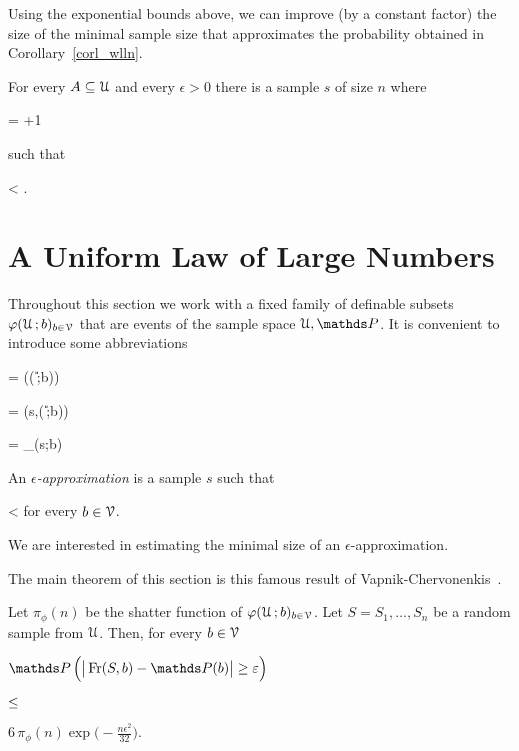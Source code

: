 \documentclass[scombinatorics.tex]{subfiles}
\begin{document}
Using the exponential bounds above, we can improve (by a constant factor) the size of the minimal sample size that approximates the probability obtained in Corollary~\ref{corl_wlln}.

\begin{corollary}
  For every $A\subseteq\EuScript U$ and every $\epsilon>0$ there is a sample $s$ of size $n$ where

  {=}
  {\left\lfloor{}+1\right\rfloor} 
      
  such that

  {<}
  {\epsilon.}\QED
\end{corollary}
\section{A Uniform Law of Large Numbers}\label{uniform}

Throughout this section we work with a fixed family of definable subsets $\varphi(\EuScript U\,;b)_{b\in\EuScript V}$ that are events of the sample space $\U,\Pr$.
It is convenient to introduce some abbreviations

{=}
{\Pr\Big(\phi(\U\,;b)\Big)}

{=}
{\Fr\Big(s,\phi(\U\,;b)\Big)}

{=}
{\Indicator_{\phi(s;b)}}

An \emph{$\epsilon$-approximation\/} is a sample $s$ such that

{<}
{\epsilon}
\hfill for every $b\in\EuScript V$.

We are interested in estimating the minimal size of an $\epsilon$-approximation.

The main theorem of this section is this famous result of Vapnik-Chervonenkis~\cite{VC}.


\def\medrel#1{\parbox[t]{5ex}{$\displaystyle\hfil #1$}}
\def\ceq#1#2#3{\parbox[t]{35ex}{$\displaystyle #1$}\medrel{#2}{$\displaystyle #3$}}

\begin{void_thm}\label{VC_inequality}
  Let $\pi_\phi(n)$ be the shatter function of $\varphi(\EuScript U\,;b)_{b\in\EuScript V}$.
  Let $S=S_1,\dots,S_n$ be a random sample from $\EuScript U$.
  Then, for every $b\in\EuScript V$

  \ceq{\hfill\Pr\,\Big(\big|\Fr(S,b) - \Pr(b)\big|\ge\epsilon\Big)}
  {\le}
  {6\,\pi_\phi(n)\exp\bigg(-\frac{n\epsilon^2}{32}\bigg).}
\end{void_thm}
\end{document}
